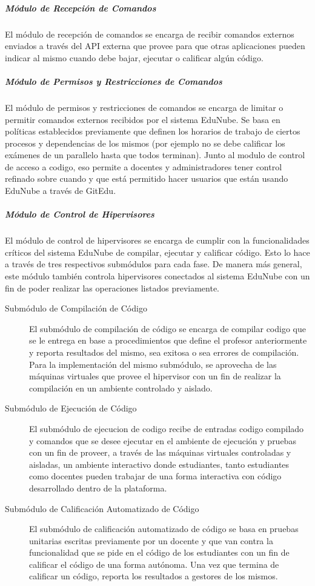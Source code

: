 \subparagraph{Módulo de Recepción de Comandos}
 
El módulo de recepción de comandos se encarga de recibir comandos externos enviados a través del API externa que provee para que otras aplicaciones pueden indicar al mismo cuando debe bajar, ejecutar o calificar algún código.

\subparagraph{Módulo de Permisos y Restricciones de Comandos}
 
El módulo de permisos y restricciones de comandos se encarga de limitar o permitir comandos externos recibidos por el sistema EduNube. Se basa en políticas establecidos previamente que definen los horarios de trabajo de ciertos procesos y dependencias de los mismos (por ejemplo no se debe calificar los exámenes de un parallelo hasta que todos terminan). Junto al modulo de control de acceso a codigo, eso permite a docentes y administradores tener control refinado sobre cuando y que está permitido hacer usuarios que están usando EduNube a través de GitEdu.

\subparagraph{Módulo de Control de Hipervisores}
 
El módulo de control de hipervisores se encarga de cumplir con la funcionalidades críticos del sistema EduNube de compilar, ejecutar y calificar código. Esto lo hace a través de tres respectivos submódulos para cada fase. De manera más general, este módulo también controla hipervisores conectados al sistema EduNube con un fin de poder realizar las operaciones listados previamente.
\begin{description}
	\item[Submódulo de Compilación de Código] 
	El submódulo de compilación de código se encarga de compilar codigo que se le entrega en base a procedimientos que define el profesor anteriormente y reporta resultados del mismo, sea exitosa o sea errores de compilación. Para la implementación del mismo submódulo, se aprovecha de las máquinas virtuales que provee el hipervisor con un fin de realizar la compilación en un ambiente controlado y aislado.
    \item[Submódulo de Ejecución de Código] 
	El submódulo de ejecucion de codigo recibe de entradas codigo compilado y comandos que se desee ejecutar en el ambiente de ejecución y pruebas con un fin de proveer, a través de las máquinas virtuales controladas y aisladas, un ambiente interactivo donde estudiantes, tanto estudiantes como docentes pueden trabajar de una forma interactiva con código desarrollado dentro de la plataforma.
    \item[Submódulo de Calificación Automatizado de Código] 
	El submódulo de calificación automatizado de código se basa en pruebas unitarias escritas previamente por un docente y que van contra la funcionalidad que se pide en el código de los estudiantes con un fin de calificar el código de una forma autónoma. Una vez que termina de calificar un código, reporta los resultados a gestores de los mismos.
\end{description}

